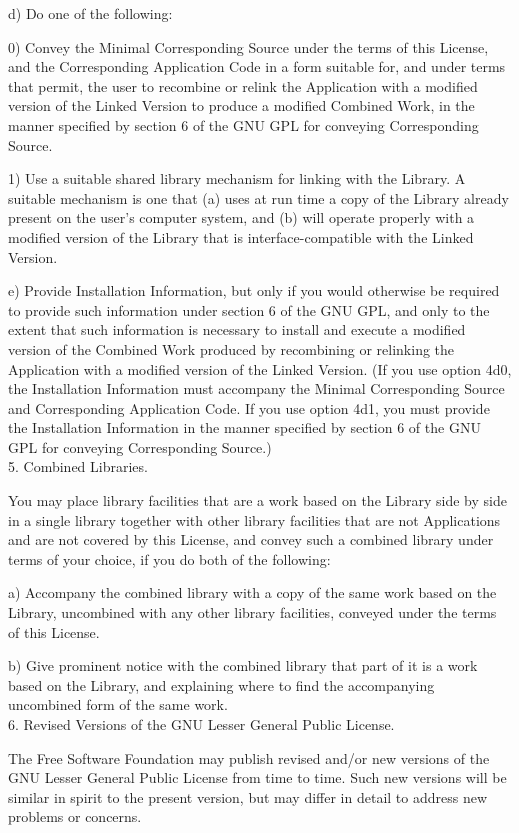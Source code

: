 d) Do one of the following:

0) Convey the Minimal Corresponding Source under the terms of this
License, and the Corresponding Application Code in a form
suitable for, and under terms that permit, the user to
recombine or relink the Application with a modified version of
the Linked Version to produce a modified Combined Work, in the
manner specified by section 6 of the GNU GPL for conveying
Corresponding Source.

1) Use a suitable shared library mechanism for linking with the
Library.  A suitable mechanism is one that (a) uses at run time
a copy of the Library already present on the user's computer
system, and (b) will operate properly with a modified version
of the Library that is interface-compatible with the Linked
Version.

e) Provide Installation Information, but only if you would otherwise
be required to provide such information under section 6 of the
GNU GPL, and only to the extent that such information is
necessary to install and execute a modified version of the
Combined Work produced by recombining or relinking the
Application with a modified version of the Linked Version. (If
you use option 4d0, the Installation Information must accompany
the Minimal Corresponding Source and Corresponding Application
Code. If you use option 4d1, you must provide the Installation
Information in the manner specified by section 6 of the GNU GPL
for conveying Corresponding Source.) \\

5. Combined Libraries.

You may place library facilities that are a work based on the
Library side by side in a single library together with other library
facilities that are not Applications and are not covered by this
License, and convey such a combined library under terms of your
choice, if you do both of the following:

a) Accompany the combined library with a copy of the same work based
on the Library, uncombined with any other library facilities,
conveyed under the terms of this License.

b) Give prominent notice with the combined library that part of it
is a work based on the Library, and explaining where to find the
accompanying uncombined form of the same work. \\

6. Revised Versions of the GNU Lesser General Public License.

The Free Software Foundation may publish revised and/or new versions
of the GNU Lesser General Public License from time to time. Such new
versions will be similar in spirit to the present version, but may
differ in detail to address new problems or concerns.


